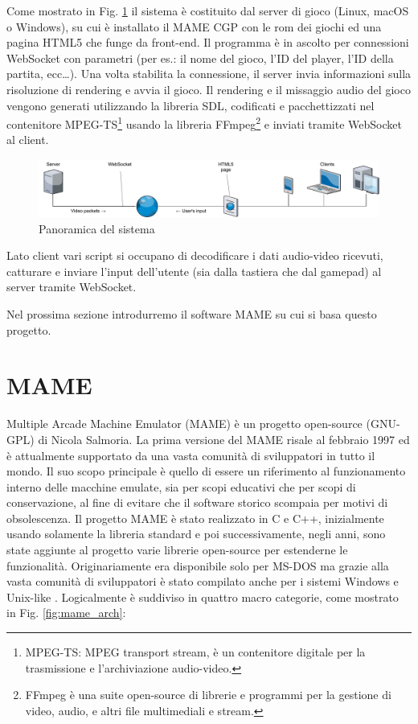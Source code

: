 Come mostrato in Fig. \ref{fig:proposed_system} il sistema è costituito dal server di gioco (Linux, macOS o Windows), su cui è installato il MAME CGP con le rom dei giochi ed una pagina HTML5 che funge da front-end. Il programma è in ascolto per connessioni WebSocket con parametri (per es.: il nome del gioco, l'ID del player, l'ID della partita, ecc\dots). Una volta stabilita la connessione, il server invia informazioni sulla risoluzione di rendering e avvia il gioco. Il rendering e il missaggio audio del gioco vengono generati utilizzando la libreria SDL, codificati e pacchettizzati nel contenitore MPEG-TS\footnote{MPEG-TS: MPEG transport stream, è un contenitore digitale per la trasmissione e l'archiviazione audio-video.} usando la libreria FFmpeg\footnote{FFmpeg è una suite open-source di librerie e programmi per la gestione di video, audio, e altri file multimediali e stream.} e inviati tramite WebSocket al client.

\begin{figure}[H]
	\includegraphics[width=\linewidth]{immagini/proposed_system}
	\caption{Panoramica del sistema}
	\label{fig:proposed_system}
\end{figure}

Lato client vari script si occupano di decodificare i dati audio-video ricevuti, catturare e inviare l'input dell'utente (sia dalla tastiera che dal gamepad) al server tramite WebSocket.

Nel prossima sezione introdurremo il software MAME su cui si basa questo progetto.




\section{MAME}
Multiple Arcade Machine Emulator (MAME) è un progetto open-source (GNU-GPL) di Nicola Salmoria. La prima versione del MAME risale al febbraio 1997 ed è attualmente supportato da una vasta comunità di sviluppatori in tutto il mondo. Il suo scopo principale è quello di essere un riferimento al funzionamento interno delle macchine emulate, sia per scopi educativi che per scopi di conservazione, al fine di evitare che il software storico scompaia per motivi di obsolescenza. Il progetto MAME è stato realizzato in C e C++, inizialmente usando solamente la libreria standard e poi successivamente, negli anni, sono state aggiunte al progetto varie librerie open-source per estenderne le funzionalità. Originariamente era disponibile solo per MS-DOS ma grazie alla vasta comunità di sviluppatori è stato compilato anche per i sistemi Windows e Unix-like \parencite{MAME}. Logicalmente è suddiviso in quattro macro categorie, come mostrato in Fig. \ref{fig:mame_arch}:

